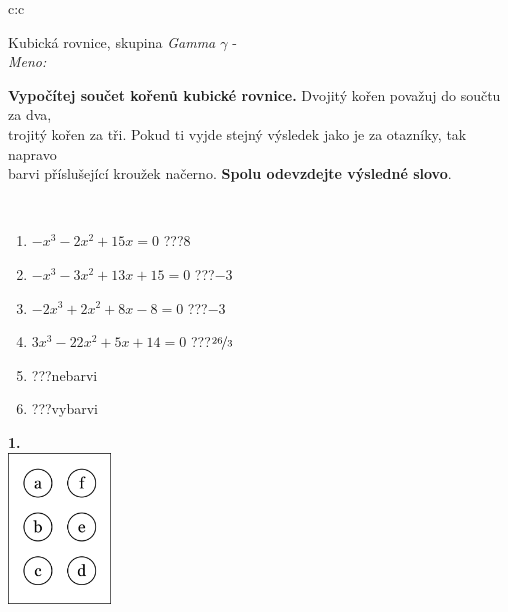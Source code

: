 \documentclass[10pt]{report}
\begin{document}
\begin{tabular}{c:c}
\begin{minipage}[c][104.5mm][t]{0.5\linewidth}
\begin{center}
\vspace{7mm}
{\huge Kubická rovnice, skupina \textit{Gamma $\gamma$} -}\\[5mm]
\textit{Meno:}\phantom{xxxxxxxxxxxxxxxxxxxxxxxxxxxxxxxxxxxxxxxxxxxxxxxxxxxxxxxxxxxxxxxxx}\\[5mm]
\begin{minipage}{0.95\linewidth}
\textbf{Vypočítej součet kořenů kubické rovnice.} Dvojitý kořen považuj do součtu za dva,\\trojitý kořen za tři. Pokud ti vyjde stejný výsledek jako je za otazníky, tak napravo\\barvi příslušející kroužek načerno. \textbf{Spolu odevzdejte výsledné slovo}.
\end{minipage}
\\[1mm]
\begin{minipage}{0.79\linewidth}
\begin{center}
\begin{varwidth}{\linewidth}
\begin{enumerate}
\Large
\item $-x^3-2x^2+15x=0$\quad \dotfill\; ???\;\dotfill \quad $8$
\item $-x^3-3x^2+13x+15=0$\quad \dotfill\; ???\;\dotfill \quad $-3$
\item $-2x^3+2x^2+8x-8=0$\quad \dotfill\; ???\;\dotfill \quad $-3$
\item $3x^3-22x^2+5x+14=0$\quad \dotfill\; ???\;\dotfill \quad $\nicefrac{26}{3}$
\item \quad \dotfill\; ???\;\dotfill \quad nebarvi
\item \quad \dotfill\; ???\;\dotfill \quad vybarvi
\end{enumerate}
\end{varwidth}
\end{center}
\end{minipage}
\begin{minipage}{0.20\linewidth}
\begin{center}
{\Huge\bfseries 1.} \\[2mm]
\includegraphics[height=40mm]{../images/braille.png}

\end{center}
\end{minipage}
\end{center}
\end{minipage}
\end{tabular}
\end{document}
